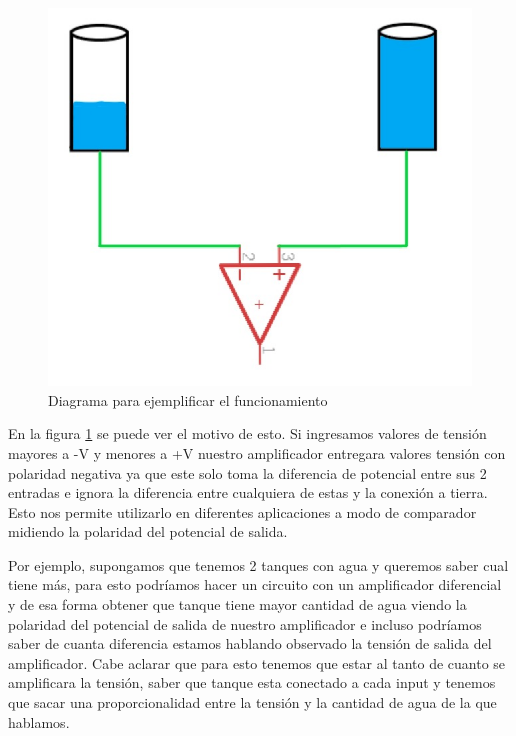 \documentclass[../main.tex]{subfiles}
\begin{document}
	\begin{figure}[H]
		\centering
		\includegraphics[width= \textwidth]{imagen20}
		\caption{Diagrama para ejemplificar el funcionamiento}
		\label{fig:20}
	\end{figure}
	En la figura \ref{fig:20} se puede ver el motivo de esto. Si ingresamos valores de tensión mayores 
	a -V y menores a +V nuestro amplificador entregara valores tensión con 
	polaridad negativa ya que este solo toma la diferencia de potencial entre 
	sus 2 entradas e ignora la diferencia entre cualquiera de estas y la 
	conexión a tierra. Esto nos permite utilizarlo en diferentes aplicaciones a 
	modo de comparador midiendo la polaridad del potencial de salida. 

	Por ejemplo, supongamos que tenemos 2 tanques con agua y queremos saber cual tiene 
	más, para esto podríamos hacer un circuito con un amplificador diferencial y de 
	esa forma obtener que tanque tiene mayor cantidad de agua viendo la polaridad del 
	potencial de salida de nuestro amplificador e incluso podríamos saber de cuanta 
	diferencia estamos hablando observado la tensión de salida del amplificador. Cabe 
	aclarar que para esto tenemos que estar al tanto de cuanto se amplificara la 
	tensión, saber que tanque esta conectado a cada input y tenemos que sacar una 
	proporcionalidad entre la tensión y la cantidad de agua de la que hablamos.
\end{document}
